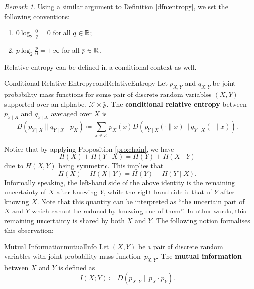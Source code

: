 \documentclass[math]{amznotes}
\theoremstyle{remark}
\newtheorem*{remark}{Remark}
\begin{document}
\begin{notebox}
    \begin{remark}
        Using a similar argument to Definition \ref{dfn:entropy}, we set the following conventions:
        \begin{enumerate}
            \item $0\log_2\frac{0}{q} = 0$ for all $q \in \mathbb{R}$;
            \item $p\log_2\frac{p}{0} = +\infty$ for all $p \in \mathbb{R}$.
        \end{enumerate}
    \end{remark}
\end{notebox}
Relative entropy can be defined in a conditional context as well.
\begin{dfnbox}{Conditional Relative Entropy}{condRelativeEntropy}
    Let $p_{X, Y}$ and $q_{X, Y}$ be joint probability mass functions for some pair of discrete random variables $\left(X, Y\right)$ supported over an alphabet $\mathcal{X} \times \mathcal{Y}$. The {\color{red} \textbf{conditional relative entropy}} between $p_{Y \mid X}$ and $q_{Y \mid X}$ averaged over $X$ is 
    \begin{equation*}
        D\left(p_{Y \mid X} \parallel q_{Y \mid X} \mid p_X\right) \coloneqq \sum_{x \in \mathcal{X}}p_X\left(x\right)D\left(p_{Y \mid X}\left(\cdot \parallel x\right) \parallel q_{Y \mid X}\left(\cdot \parallel x\right)\right).
    \end{equation*}
\end{dfnbox}
Notice that by applying Proposition \ref{pro:chain}, we have 
\begin{equation*}
    H\left(X\right) + H\left(Y \mid X\right) = H\left(Y\right) + H\left(X \mid Y\right)
\end{equation*}
due to $H\left(X, Y\right)$ being symmetric. This implies that 
\begin{equation*}
    H\left(X\right) - H\left(X \mid Y\right) = H\left(Y\right) - H\left(Y \mid X\right).
\end{equation*}
Informally speaking, the left-hand side of the above identity is the remaining uncertainty of $X$ after knowing $Y$, while the right-hand side is that of $Y$ after knowing $X$. Note that this quantity can be interpreted as ``the uncertain part of $X$ and $Y$ which cannot be reduced by knowing one of them''. In other words, this remaining uncertainty is shared by both $X$ and $Y$. The following notion formalises this observation:
\begin{dfnbox}{Mutual Information}{mutualInfo}
    Let $\left(X, Y\right)$ be a pair of discrete random variables with joint probability mass function~$p_{X, Y}$. The {\color{red} \textbf{mutual information}} between $X$ and $Y$ is defined as 
    \begin{equation*}
        I\left(X ; Y\right) \coloneqq D\left(p_{X, Y} \parallel p_X \cdot p_Y\right).
    \end{equation*}
\end{dfnbox}
\end{document}
